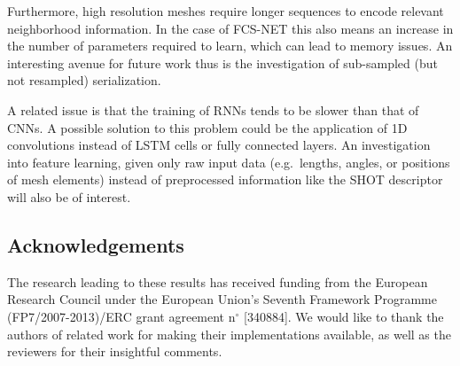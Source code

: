 \documentclass[runningheads]{llncs}
\begin{document}
Furthermore, high resolution meshes require longer sequences to encode relevant neighborhood information. In the case of FCS-NET this also means an increase in the number of parameters required to learn, which can lead to memory issues. An interesting avenue for future work thus is the investigation of sub-sampled (but not resampled) serialization.

A related issue is that the training of RNNs tends to be slower than that of CNNs.
A possible solution to this problem could be the application of 1D convolutions instead of LSTM cells or fully connected layers.
An investigation into feature learning, given only raw input data (e.g.\ lengths, angles, or positions of mesh elements) instead of preprocessed information like the SHOT descriptor will also be of interest.
\subsection*{Acknowledgements}
The research leading to these results has received funding from the European Research Council under the European Union's Seventh Framework Programme (FP7/2007-2013)/ERC grant agreement n$^\circ$ [340884].
We would like to thank the authors of related work \cite{masci2015geodesic,boscaini2016learning} for making their implementations available, as well as the reviewers for their insightful comments.
\end{document}
